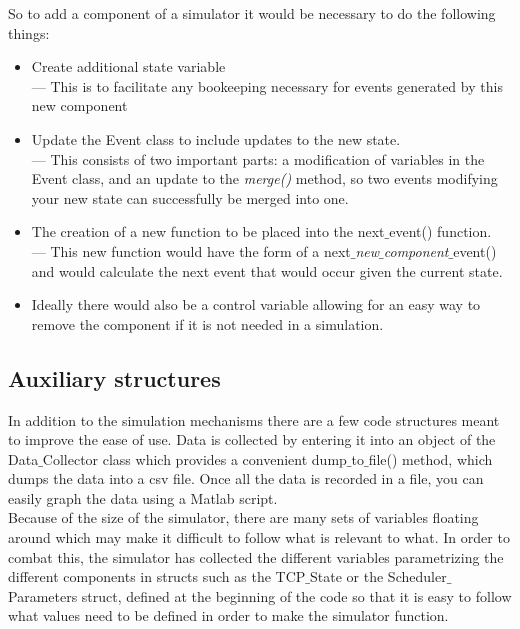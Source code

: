 \documentclass[11pt]{article}%
\begin{document}
So to add a component of a simulator it would be necessary to do the following things:
\begin{itemize}
\item Create additional state variable\\
--- This is to facilitate any bookeeping necessary for events generated by this new component
\item Update the Event class to include updates to the new state.\\
--- This consists of two important parts: a modification of variables in the Event class, and an update to the {\it merge()} method, so two events modifying your new state can successfully be merged into one.
\item The creation of a new function to be placed into the next$\_$event() function.\\
--- This new function would have the form of a next$\_${\it new$\_$component}$\_$event() and would calculate the next event that would occur given the current state.
\item Ideally there would also be a control variable allowing for an easy way to remove the component if it is not needed in a simulation.
\end{itemize}
\subsection{Auxiliary structures}
In addition to the simulation mechanisms there are a few code structures meant to improve the ease of use.  Data is collected by entering it into an object of the Data$\_$Collector class which provides a convenient dump$\_$to$\_$file() method, which dumps the data into a csv file.  Once all the data is recorded in a file, you can easily graph the data using a Matlab script.\\

Because of the size of the simulator, there are many sets of variables floating around which may make it difficult to follow what is relevant to what.  In order to combat this, the simulator has collected the different variables parametrizing the different components in structs such as the TCP$\_$State or the Scheduler$\_$Parameters struct, defined at the beginning of the code so that it is easy to follow what values need to be defined in order to make the simulator function.\\
\end{document}
